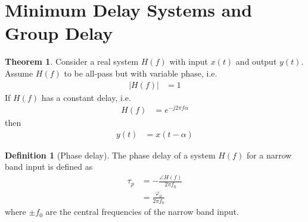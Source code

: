 \documentclass[titlepage, fleqn, a4paper, 12pt, twoside]{article}
\theoremstyle{definition}
\newtheorem{definition}{Definition}
\theoremstyle{theorem}
\newtheorem{theorem}{Theorem}
\begin{document}
\clearpage
\part{Minimum Delay Systems and Group Delay}

\begin{theorem}
	Consider a real system $H(f)$ with input $x(t)$ and output $y(t)$.
	Assume $H(f)$ to be all-pass but with variable phase, i.e.
	\begin{align*}
		\left| H(f) \right| &= 1
	\end{align*}
	If $H(f)$ has a constant delay, i.e.
	\begin{align*}
		H(f) &= e^{-j 2 \pi f \alpha}
	\end{align*}
	then
	\begin{align*}
		y(t) &= x(t - \alpha)
	\end{align*}
\end{theorem}

\begin{definition}[Phase delay]
	The phase delay of a system $H(f)$ for a narrow band input is defined as
	\begin{align*}
		\tau_p &= -\frac{\angle H(f)}{2 \pi f_0}\\
		&= \frac{\varphi_0}{2 \pi f_0}
	\end{align*}
	where $\pm f_0$ are the central frequencies of the narrow band input.
	\label{def:phase_delay}
\end{definition}
\end{document}
